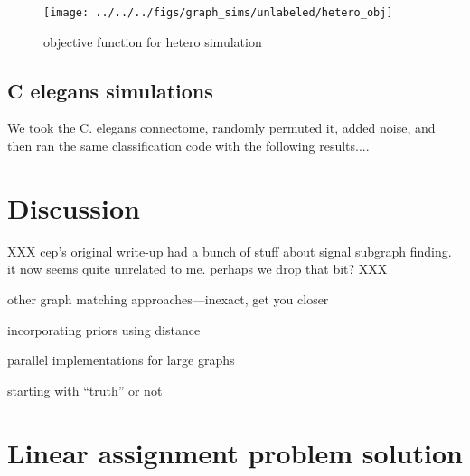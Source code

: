 \begin{figure}[!ht]
\centering \texttt{[image: ../../../figs/graph\_sims/unlabeled/hetero\_obj]}
\caption{objective function for hetero simulation}
\label{fig:sim1_params}
\end{figure}







\subsection{C elegans simulations} %
\label{sub:c_elegans_simulations}


We took the C. elegans connectome, randomly permuted it, added noise, and then ran the same classification code with the following results....



\clearpage
\section{Discussion} %
\label{sec:discussion}

XXX cep's original write-up had a bunch of stuff about signal subgraph finding.  it now seems quite unrelated to me.  perhaps we drop that bit? XXX

other graph matching approaches---inexact, get you closer

incorporating priors using distance

parallel implementations for large graphs


starting with ``truth'' or not


\clearpage
\appendix

\section{Linear assignment problem solution} %
\label{ssub:linear_assignment_problem_solution}

